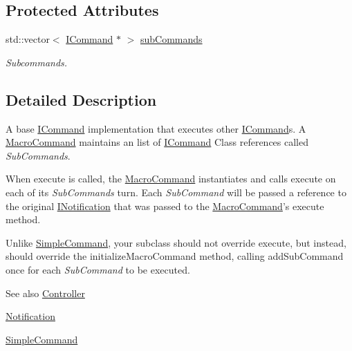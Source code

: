 \subsection*{Protected Attributes}
\begin{DoxyCompactItemize}
\item 
std::vector$<$ \hyperlink{class_pure_m_v_c_1_1_i_command}{ICommand} $\ast$ $>$ \hyperlink{class_pure_m_v_c_1_1_macro_command_a31cc41a447ed0be2e994f2f75e3d93c4}{subCommands}
\begin{DoxyCompactList}\small\item\em Subcommands. \item\end{DoxyCompactList}\end{DoxyCompactItemize}


\subsection{Detailed Description}
A base {\ttfamily \hyperlink{class_pure_m_v_c_1_1_i_command}{ICommand}} implementation that executes other {\ttfamily \hyperlink{class_pure_m_v_c_1_1_i_command}{ICommand}}s. A {\ttfamily \hyperlink{class_pure_m_v_c_1_1_macro_command}{MacroCommand}} maintains an list of {\ttfamily \hyperlink{class_pure_m_v_c_1_1_i_command}{ICommand}} Class references called {\itshape SubCommands\/}.

When {\ttfamily execute} is called, the {\ttfamily \hyperlink{class_pure_m_v_c_1_1_macro_command}{MacroCommand}} instantiates and calls {\ttfamily execute} on each of its {\itshape SubCommands\/} turn. Each {\itshape SubCommand\/} will be passed a reference to the original {\ttfamily \hyperlink{class_pure_m_v_c_1_1_i_notification}{INotification}} that was passed to the {\ttfamily \hyperlink{class_pure_m_v_c_1_1_macro_command}{MacroCommand}}'s {\ttfamily execute} method.

Unlike {\ttfamily \hyperlink{class_pure_m_v_c_1_1_simple_command}{SimpleCommand}}, your subclass should not override {\ttfamily execute}, but instead, should override the {\ttfamily initializeMacroCommand} method, calling {\ttfamily addSubCommand} once for each {\itshape SubCommand\/} to be executed.

\begin{DoxySeeAlso}{See also}
\hyperlink{class_pure_m_v_c_1_1_controller}{Controller} 

\hyperlink{class_pure_m_v_c_1_1_notification}{Notification} 

\hyperlink{class_pure_m_v_c_1_1_simple_command}{SimpleCommand} 
\end{DoxySeeAlso}


